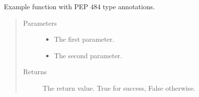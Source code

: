 \documentclass[letterpaper,10pt,english]{sphinxmanual}
\begin{document}
\begin{fulllineitems}
\label{\detokenize{source/example:example.function_with_pep484_type_annotations}}
\pysigstartsignatures
{}
\pysigstopsignatures
\sphinxAtStartPar
Example function with PEP 484 type annotations.
\begin{quote}\begin{description}
\item[{Parameters}] \leavevmode\begin{itemize}
\item {} 
\sphinxAtStartPar
{} \textendash{} The first parameter.

\item {} 
\sphinxAtStartPar
{} \textendash{} The second parameter.

\end{itemize}

\item[{Returns}] \leavevmode
\sphinxAtStartPar
The return value. True for success, False otherwise.

\end{description}\end{quote}

\end{fulllineitems}

\end{document}
